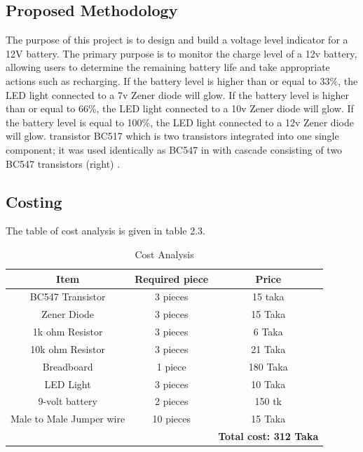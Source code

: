 \subsection{Proposed Methodology}
The purpose of this project is to design and build a voltage level indicator for a 12V battery. The primary purpose is to monitor the charge level of a 12v battery, allowing users to determine the remaining battery life and take appropriate actions such as recharging. If the battery level is higher than or equal to 33\%, the LED light connected to a 7v Zener diode will glow. If the battery level is higher than or equal to 66\%, the LED light connected to a 10v Zener diode will glow. If the battery level is equal to 100\%, the LED light connected to a 12v Zener diode will glow. transistor BC517 which is two transistors integrated into one single component; it was used identically as BC547 in with cascade consisting of two BC547 transistors (right) \cite{2}.


\subsection{Costing }

The table of cost analysis is given in table 2.3.
\begin{table}[h!]
\centering
\begin{tabular}{|  c  |c|c|}
\hline
\textbf{      Item      } & \textbf{  Required piece  } & \textbf{  Price  }  \\
\hline
 BC547 Transistor &  3 pieces & 15 taka    \\
\hline
 Zener Diode  &3 pieces  & 15 Taka    \\

\hline
1k ohm Resistor & 3 pieces & 6 Taka    \\
\hline
10k ohm Resistor & 3 pieces & 21 Taka \\
\hline
Breadboard  & 1 piece & 180 Taka  \\
\hline
LED Light  & 3 pieces & 10 Taka  \\
\hline
9-volt battery & 2 pieces & 150 tk\\
\hline
Male to Male Jumper wire  & 10 pieces & 15 Taka\\
\hline
 & & \textbf{Total cost: 312 Taka}\\
\hline
\end{tabular}
\caption{Cost Analysis }
\end{table}

